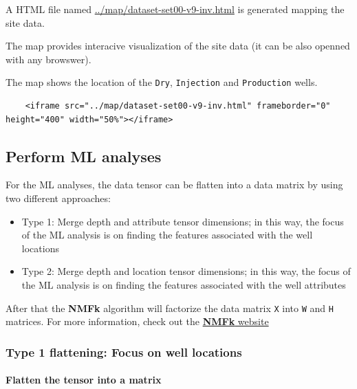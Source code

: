 \documentclass[11pt]{article}
\providecommand{\tightlist}{%
      \setlength{\itemsep}{0pt}\setlength{\parskip}{0pt}}
\begin{document}
    A HTML file named \url{../map/dataset-set00-v9-inv.html} is generated
mapping the site data.

The map provides interacive visualization of the site data (it can be
also openned with any browswer).

The map shows the location of the \texttt{Dry}, \texttt{Injection} and
\texttt{Production} wells.

\begin{verbatim}
    <iframe src="../map/dataset-set00-v9-inv.html" frameborder="0" height="400" width="50%"></iframe>
\end{verbatim}

    \hypertarget{perform-ml-analyses}{%
\subsection{Perform ML analyses}\label{perform-ml-analyses}}

For the ML analyses, the data tensor can be flatten into a data matrix
by using two different approaches:

\begin{itemize}
\tightlist
\item
  Type 1: Merge depth and attribute tensor dimensions; in this way, the
  focus of the ML analysis is on finding the features associated with
  the well locations
\item
  Type 2: Merge depth and location tensor dimensions; in this way, the
  focus of the ML analysis is on finding the features associated with
  the well attributes
\end{itemize}

After that the \textbf{NMFk} algorithm will factorize the data matrix
\texttt{X} into \texttt{W} and \texttt{H} matrices. For more
information, check out the
\href{https://github.com/SmartTensors/NMFk.jl}{\textbf{NMFk} website}

    \hypertarget{type-1-flattening-focus-on-well-locations}{%
\subsubsection{Type 1 flattening: Focus on well
locations}\label{type-1-flattening-focus-on-well-locations}}

\hypertarget{flatten-the-tensor-into-a-matrix}{%
\paragraph{Flatten the tensor into a
matrix}\label{flatten-the-tensor-into-a-matrix}}
\end{document}
